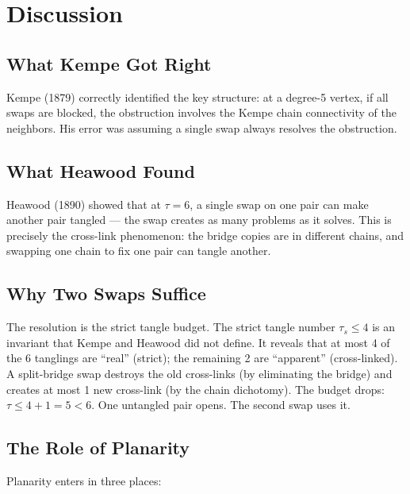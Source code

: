 \documentclass[11pt]{article}
\theoremstyle{remark}
\begin{document}
\section{Discussion}

\subsection{What Kempe Got Right}

Kempe (1879) correctly identified the key structure: at a degree-5 vertex, if all swaps are blocked, the obstruction involves the Kempe chain connectivity of the neighbors. His error was assuming a single swap always resolves the obstruction.

\subsection{What Heawood Found}

Heawood (1890) showed that at $\tau = 6$, a single swap on one pair can make another pair tangled --- the swap creates as many problems as it solves. This is precisely the cross-link phenomenon: the bridge copies are in different chains, and swapping one chain to fix one pair can tangle another.

\subsection{Why Two Swaps Suffice}

The resolution is the strict tangle budget. The strict tangle number $\tau_s \leq 4$ is an invariant that Kempe and Heawood did not define. It reveals that at most 4 of the 6 tanglings are ``real'' (strict); the remaining 2 are ``apparent'' (cross-linked). A split-bridge swap destroys the old cross-links (by eliminating the bridge) and creates at most 1 new cross-link (by the chain dichotomy). The budget drops: $\tau \leq 4 + 1 = 5 < 6$. One untangled pair opens. The second swap uses it.

\subsection{The Role of Planarity}

Planarity enters in three places:
\end{document}
